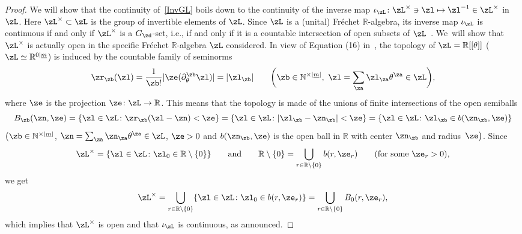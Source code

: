 \documentclass[10pt,a4paper]{amsart}
\newcommand{\R}{{\mathbb R}}
\def\ul{\underline}
\def\ul{\underline}
\newcommand{\0}{\otimes}
\numberwithin{equation}{section}
\begin{document}
\begin{proof}
We will show that the continuity of~\eqref{InvGL} boils down to the continuity of the inverse map $\iota_\zL\colon \zL^{\times}\ni\zl\mapsto \zl^{-1}\in\zL^{\times}$ in $\zL$. Here $\zL^\times\subset\zL$ is the group of invertible elements of $\zL$. Since $\zL$ is a (unital) Fr\'echet $\R$-algebra, its inverse map $\iota_\zL$ is continuous if and only if $\zL^\times$ is a $G_\zd$-set, i.e., if and only if it is a countable intersection of open subsets of $\zL$~\cite{Waelbroeck:1971}. We~will show that $\zL^\times$ is actually open in the specific Fr\'echet $\R$-algebra $\zL$ considered. In view of Equation (16) in~\cite{Bruce:2018}, the topology of $\zL=\R[[\theta]]$ ($\zL\simeq\R^{0|\ul m}$) is induced by the countable family of seminorms
\[
\zr_\zb(\zl)=\frac{1}{\zb!}|\ze(\partial^\zb_\theta \zl)|=|\zl_\zb|\qquad \bigg(\zb\in\mathbb{N}^{\times|\ul m|},\ \zl=\sum_\za \zl_\za \theta^\za\in\zL\bigg),
\]
where $\ze$ is the projection $\ze\colon \zL\to \R$. This means that the topology is made of the unions of finite intersections of the open semiballs
\[
B_\zb(\zn,\ze)=\{\zl\in\zL\colon \zr_\zb(\zl-\zn)<\ze\}=\{\zl\in\zL\colon |\zl_\zb-\zn_\zb|<\ze\}=\{\zl\in\zL\colon \zl_\zb\in b(\zn_\zb,\ze)\}
\]
$\big(\zb\in\mathbb{N}^{\times |\ul m|}$, $\zn=\sum_\za \zn_\za\theta^\za\in\zL$, $\ze>0$ and $b(\zn_\zb,\ze)$ is the open ball in $\R$ with center $\zn_\zb$ and radius~$\ze\big)$. Since
\[
\zL^\times=\{\zl\in\zL\colon \zl_0\in\R\setminus\{0\}\}\qquad\text{and}\qquad \R\setminus\{0\}=\bigcup_{r\in\R\setminus\{0\}} b(r,\ze_r)\qquad (\text{for some}\ \ze_r>0),
\]
we get
\[
\zL^\times=\bigcup_{r\in\R\setminus\{0\}}\{\zl\in\zL\colon \zl_0\in b(r,\ze_r)\}=\bigcup_{r\in\R\setminus\{0\}}B_0(r,\ze_r),
\]
which implies that $\zL^\times$ is open and that $\iota_\zL$ is continuous, as announced.


\end{proof}
\end{document}
